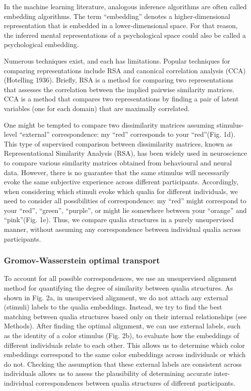 \documentclass[
  authoryear]{elsarticle}
\begin{document}
In the machine learning literature, analogous inference algorithms are
often called embedding algorithms. The term ``embedding'' denotes a
higher-dimensional representation that is embedded in a
lower-dimensional space. For that reason, the inferred mental
representations of a psychological space could also be called a
psychological embedding.

Numerous techniques exist, and each has limitations. Popular techniques
for comparing representations include RSA \citet{kriegeskorte2008} and
canonical correlation analysis (CCA) (Hotelling 1936). Briefly, RSA is a
method for comparing two representations that assesses the correlation
between the implied pairwise similarity matrices. CCA is a method that
compares two representations by finding a pair of latent variables (one
for each domain) that are maximally correlated.

One might be tempted to compare two dissimilarity matrices assuming
stimulus-level ``external'' correspondence: my ``red'' corresponds to
your ``red''(Fig. 1d). This type of supervised comparison between
dissimilarity matrices, known as Representational Similarity Analysis
(RSA), has been widely used in neuroscience to compare various
similarity matrices obtained from behavioural and neural data. However,
there is no guarantee that the same stimulus will necessarily evoke the
same subjective experience across different participants. Accordingly,
when considering which stimuli evoke which qualia for different
individuals, we need to consider all possibilities of correspondence: my
``red'' might correspond to your ``red'', ``green'', ``purple'', or
might lie somewhere between your ``orange'' and ``pink''(Fig. 1e). Thus,
we compare qualia structures in a purely unsupervised manner, without
assuming any correspondence between individual qualia across
participants.

\subsubsection{Gromov-Wasserstein optimal
transport}\label{gromov-wasserstein-optimal-transport}

To account for all possible correspondences, we use an unsupervised
alignment method for quantifying the degree of similarity between qualia
structures. As shown in Fig. 2a, in unsupervised alignment, we do not
attach any external (stimuli) labels to the qualia embeddings. Instead,
we try to find the best matching between qualia structures based only on
their internal relationships (see Methods). After finding the optimal
alignment, we can use external labels, such as the identity of a color
stimulus (Fig. 2b), to evaluate how the embeddings of different
individuals relate to each other. This allows us to determine which
color embeddings correspond to the same color embeddings across
individuals or which do not. Checking the assumption that these external
labels are consistent across individuals allows us to assess the
plausibility of determining accurate inter-individual correspondences
between qualia structures of different participants.
\end{document}
